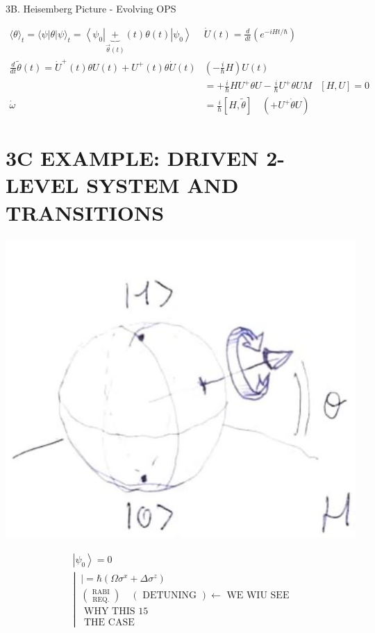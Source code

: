 \documentclass[10pt]{article}
\begin{document}
3B. Heisemberg Picture - Evolving OPS

$$
\begin{array}{rlr}
\langle\theta\rangle_{t}=\langle\psi| \theta|\psi\rangle_{t}=\left\langle\psi_{0}\right| \underbrace{+}_{\vec{\theta}(t)}(t) \theta(t)\left|\psi_{0}\right\rangle & \dot{U}(t)=\frac{d}{d t}\left(e^{-i H t / \hbar}\right) \\
\frac{d}{d t} \tilde{\theta}(t)=\dot{U}^{+}(t) \theta U(t)+U^{+}(t) \theta \dot{U}(t) & \left(-\frac{i}{\hbar} H\right) U(t) \\
& =+\frac{i}{\hbar} H U^{+} \theta U-\frac{i}{\hbar} U^{+} \theta U M & {[H, U]=0} \\
\dot{\omega} & =\frac{i}{\hbar}[H, \tilde{\theta}] \quad\left(+U^{+} \dot{\theta} U\right) &
\end{array}
$$

\section*{3C EXAMPLE: DRIVEN 2-LEVEL SYSTEM AND TRANSITIONS}
\begin{center}
\includegraphics[max width=\textwidth]{2025_10_16_f02af6fa434c9f0bcc00g-11}
\end{center}

$$
\begin{aligned}
& \left|\psi_{0}\right\rangle=0 \\
& \left\lvert\, \begin{array}{l}
\mid=\hbar\left(\Omega \sigma^{x}+\Delta \sigma^{z}\right) \\
\binom{\text { RABI }}{\text { REQ. }} \quad(\text { DETUNING }) \leftarrow \text { WE WIU SEE } \\
\text { WHY THIS } 15 \\
\text { THE CASE }
\end{array}\right.
\end{aligned}
$$
\end{document}
